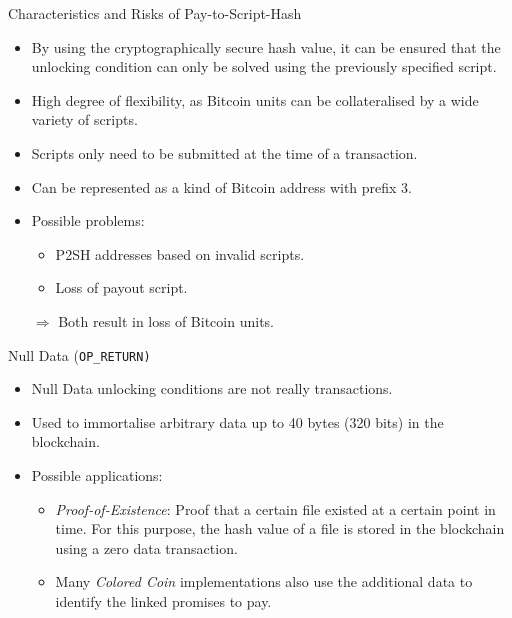 \documentclass[]{beamer}
\begin{document}
\begin{frame}{Characteristics and Risks of Pay-to-Script-Hash}
\begin{itemize}
	\item<1-> By using the cryptographically secure hash value, it can be ensured that the unlocking condition can only be solved using the previously specified script.
	\item<2-> High degree of flexibility, as Bitcoin units can be collateralised by a wide variety of scripts.
	\item<3-> Scripts only need to be submitted at the time of a transaction. %
	\item<4-> Can be represented as a kind of Bitcoin address with prefix 3. %
	\vspace{1em}
	\item<5-> Possible problems: 
	\begin{itemize}
  \item<5-> P2SH addresses based on invalid scripts.
  \item<5-> Loss of payout script.
\end{itemize}\vspace{0.5em}
$\Rightarrow$ Both result in loss of Bitcoin units.
\end{itemize}
\end{frame}


\begin{frame}{Null Data (\texttt{OP\_RETURN)}}
\begin{itemize}
  \item<1-> Null Data unlocking conditions are not really transactions.
  \item<2-> Used to immortalise arbitrary data up to 40 bytes (320 bits) in the blockchain.
  \item<3-> Possible applications: 
    \begin{itemize}
      \item<3-> \textit{Proof-of-Existence}: Proof that a certain file existed at a certain point in time. For this purpose, the hash value of a file is stored in the blockchain using a zero data transaction.
      \item<3-> Many \textit{Colored Coin} implementations also use the additional data to identify the linked promises to pay.
    \end{itemize}
\end{itemize}
\end{frame}
\end{document}
